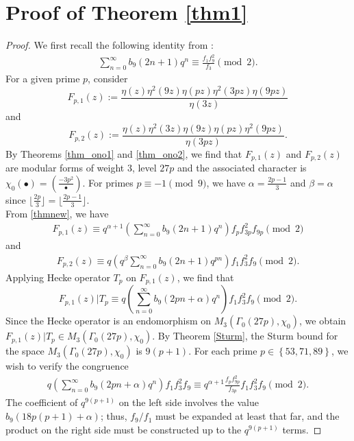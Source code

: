 \documentclass[reqno]{amsart}
\theoremstyle{definition}
\theoremstyle{remark}
\numberwithin{equation}{section}
\begin{document}
\section{Proof of Theorem \ref{thm1}}
\begin{proof}
	We first recall the following identity from \cite[(3.2)]{xia_yao}:
	\begin{align}\label{thmnew}
\sum_{n=0}^{\infty}b_9(2n+1)q^{n}\equiv\frac{f_1f^{2}_9}{f_3}\pmod{2}.
\end{align}
For a given prime $p$, consider
 $$F_{p,1}(z):= \frac{\eta(z)\eta^2(9z)\eta(pz)\eta^2(3pz)\eta(9pz)}{\eta(3z)}$$
and $$F_{p,2}(z):= \frac{\eta(z)\eta^2(3z)\eta(9z)\eta(pz)\eta^2(9pz)}{\eta(3pz)}.$$
By Theorems \ref{thm_ono1} and \ref{thm_ono2}, we find that $F_{p,1}(z)$ and $F_{p,2}(z)$ are modular forms of weight $3$, level $27p$ and the associated character is $\chi_0(\bullet)=(\frac{-3p^2}{\bullet})$. 
For primes $p\equiv-1 \pmod9$, we have $\alpha=\frac{2p-1}{3}$ and $\beta=\alpha$ since $\lfloor \frac{2p}{3}\rfloor=\lfloor \frac{2p-1}{3}\rfloor$. \\
From \eqref{thmnew}, we have
\begin{align*}
F_{p,1}(z)\equiv q^{\alpha+1}\left(\sum_{n=0}^{\infty}b_9(2n+1)q^{n}\right) f_pf^{2}_{3p}f_{9p}\pmod{2}
\end{align*}
and
\begin{align*}
F_{p,2}(z)\equiv q\left(q^{\beta}\sum_{n=0}^{\infty}b_9(2n+1)q^{pn} \right) f_1f^{2}_{3}f_{9}\pmod{2}.
\end{align*}	
 Applying Hecke operator $T_p$ on $F_{p,1}(z)$, we find that
\begin{equation*}
F_{p,1}(z)|T_p\equiv q\left(\sum_{n=0}^{\infty}b_9(2pn+\alpha)q^{n} \right)f_1f^{2}_3f_9\pmod{2}.
\end{equation*}
Since the Hecke operator is an endomorphism on $M_{3}\left(\Gamma_{0}(27p), \chi_0\right)$, we obtain $F_{p,1}(z)|T_{p}\in M_{3}\left(\Gamma_{0}(27p), \chi_0\right)$. 
By Theorem \ref{Sturm}, the Sturm bound for the space $M_{3}\left(\Gamma_{0}(27p), \chi_0\right)$ is $9(p+1)$. For each prime $p\in\left\lbrace53, 71, 89\right\rbrace$, we wish to verify the congruence
\begin{align*}
q\left(\sum_{n=0}^{\infty}b_9(2pn+\alpha)q^{n} \right)f_1f^{2}_3f_9\equiv q^{\alpha+1}\frac{f_pf^{2}_{9p}}{f_{3p}}f_1f^{2}_{3}f_{9}\pmod 2.
\end{align*}
The coefficient of $q^{9(p+1)}$ on the left side involves the value $b_9(18p(p+1)+\alpha)$; thus, $f_9/f_1$ must be expanded at least that far, and the product on the right side must be constructed up to the $q^{9(p+1)}$ terms. 

\end{proof}
\end{document}
